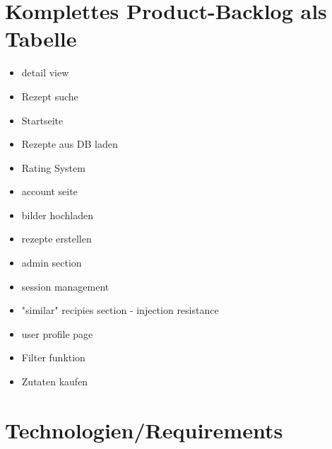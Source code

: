 \documentclass{report}
\begin{document}
\section{Komplettes Product-Backlog als Tabelle}
\begin{multicols}{2}
\begin{itemize}
    \item detail view
    \item Rezept suche
    \item Startseite
    \item Rezepte aus DB laden
    \item Rating System
    \item account seite
    \item bilder hochladen
    \item rezepte erstellen
    \item admin section
    \item session management
    \item "similar" recipies section - injection resistance
    \item user profile page
    \item Filter funktion
    \item Zutaten kaufen
\end{itemize}
\end{multicols}


\section{Technologien/Requirements}
\end{document}
